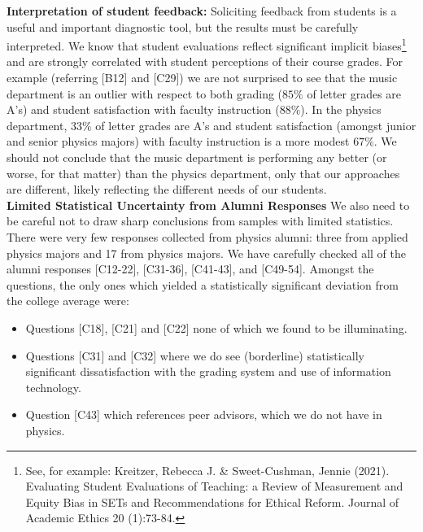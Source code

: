 \documentclass[12pt]{article}
\begin{document}
\noindent
{\bf Interpretation of student feedback:} Soliciting feedback from
students is a useful and important diagnostic tool, but the results
must be carefully interpreted.  We know that student evaluations
reflect significant implicit biases\footnote{See,
for example: Kreitzer, Rebecca J. \& Sweet-Cushman, Jennie
(2021). Evaluating Student Evaluations of Teaching: a Review of
Measurement and Equity Bias in SETs and Recommendations for Ethical
Reform. Journal of Academic Ethics 20 (1):73-84.}  and are strongly
correlated with student perceptions of their course grades.  For
example (referring [B12] and [C29]) we are not surprised to see that the
music department is an outlier with respect to both grading ($85\%$ of
letter grades are A's) and student satisfaction with faculty
instruction ($88\%$).  In the physics department, $33\%$ of letter
grades are A's and student satisfaction (amongst junior and senior physics majors) with faculty
instruction is a more modest $67\%$.  We should not conclude that the
music department is performing any better (or worse, for that matter)
than the physics department, only that our approaches are different,
likely reflecting the different needs of our students.\\[3pt]

\noindent
{\bf Limited Statistical Uncertainty from Alumni Responses}
We also need to be careful not to draw sharp conclusions from samples
with limited statistics.  There were very few responses collected from
physics alumni: three from applied physics majors and 17 from physics
majors.  We have carefully checked all of the alumni responses
[C12-22], [C31-36], [C41-43], and [C49-54].  Amongst the questions,
the only ones which yielded a statistically significant deviation from
the college average were:
\begin{itemize}
  \item Questions [C18], [C21] and [C22] none of which we found to be illuminating.
  \item Questions [C31] and [C32] where we do see (borderline) statistically significant dissatisfaction with the grading system and use of information technology.   
  \item Question [C43] which references peer advisors, which we do not have in physics.
\end{itemize}
\end{document}
